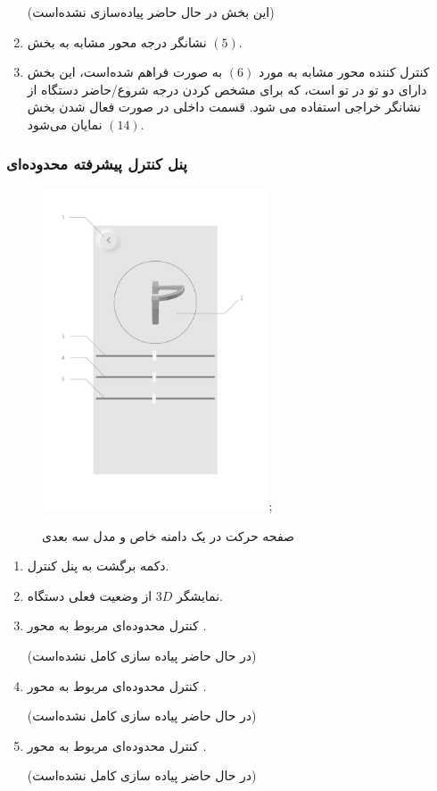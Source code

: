 \documentclass[a4paper,12pt]{report}
\begin{document}
\begin{enumerate}[nosep]
			\danger
			(این بخش در حال حاضر پیاده‌سازی نشده‌است)
		\item%
			نشانگر درجه محور
			مشابه به بخش
			$ (5) $.
		\item
			کنترل کننده محور
			مشابه به مورد
			$ (6) $
			به صورت
			فراهم شده‌است، این بخش دارای دو
			تو در تو است، که برای مشخص کردن درجه شروع/حاضر دستگاه از نشانگر خراجی استفاده می شود.
			قسمت داخلی در صورت فعال شدن بخش
			$ (14) $
			نمایان می‌شود.
	\end{enumerate}

	\subsubsection{
		پنل کنترل پیشرفته محدوده‌ای
	}\label{subsec3:sec2:chap2}

	\begin{figure}[!h]
		\centering

		\includegraphics[width=0.6\textwidth]{resources/advanced-range-mode-labeled.pdf};
		\caption{
		صفحه حرکت در یک دامنه خاص و مدل سه بعدی
		}
		\label{fig2:subsec2:sec2:chap2}
	\end{figure}

	\begin{enumerate}[nosep]
		\item
			دکمه برگشت به پنل کنترل.
		\item
			نمایشگر
			$3D$
			از وضعیت فعلی دستگاه.
		\item
			کنترل محدوده‌ای مربوط به محور
			.

			\danger
			(در حال حاضر پیاده سازی کامل نشده‌است)
		\item
			کنترل محدوده‌ای مربوط به محور
			.

			\danger
			(در حال حاضر پیاده سازی کامل نشده‌است)
		\item
			کنترل محدوده‌ای مربوط به محور
			.

			\danger
			(در حال حاضر پیاده سازی کامل نشده‌است)
	\end{enumerate}
\end{document}
